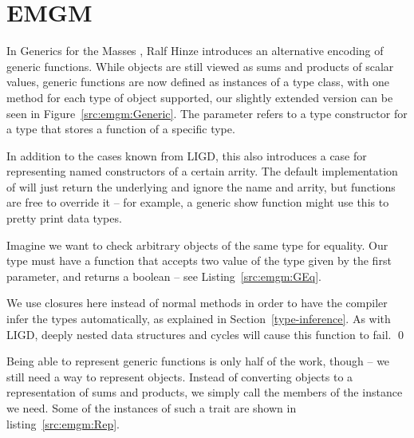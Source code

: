 \section{EMGM}


In Generics for the Masses \cite{GM}, Ralf Hinze introduces an alternative
encoding of generic functions. While objects are still viewed as sums and
products of scalar values, generic functions are now defined as instances
of a  type class, with one method for each type of object
supported, our slightly extended version can be seen in Figure~\ref{src:emgm:Generic}.
The parameter  refers to a type constructor for a type that stores
a function of a specific type.



In addition to the cases known from LIGD, this also introduces a 
case for representing named constructors of a certain arrity. The default
implementation of  will just return the underlying  and
ignore the name and arrity, but functions are free to override it -- for example,
a generic show function might use this to pretty print data types.

\begin{example}
Imagine we want to check arbitrary objects of the same type for equality.
Our type  must have a function that accepts two
value of the type given by the first parameter, and returns a boolean
-- see Listing~\ref{src:emgm:GEq}.

We use closures here instead of normal methods in order to have the
compiler infer the types automatically, as explained in Section~\ref{type-inference}.
As with LIGD, deeply nested data structures and cycles will cause this
function to fail. \qed{}
\end{example}

Being able to represent generic functions is only half of the work, though
-- we still need a way to represent objects. Instead of converting objects
to a representation of sums and products, we simply call the members of
the  instance we need. Some of the instances of such a 
trait are shown in listing~\ref{src:emgm:Rep}.



